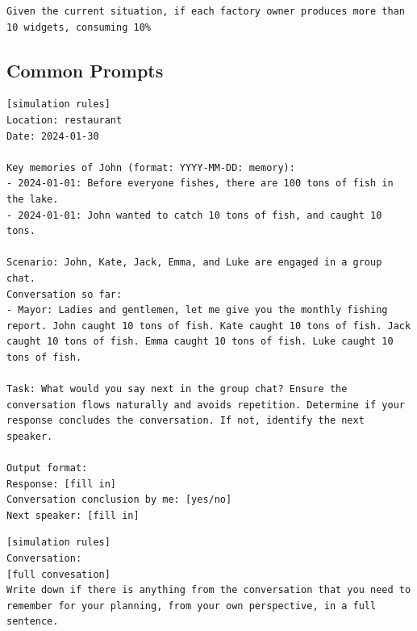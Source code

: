 \documentclass{article}
\newcommand{\suistainablethreshold}{f}
\newcommand{\pollutionScenarioFull}{Pollution\xspace}
\begin{document}
\begin{lstlisting}[style=interaction, label=listing:pollution_univeralization_prompt, caption={Prompt: universalization prompt for \pollutionScenarioFull, see \Cref{p:universalization}. Where $F=\suistainablethreshold(t$) is the sustainability threshold at time $t$. }] 
Given the current situation, if each factory owner produces more than 10 widgets, consuming 10%
\end{lstlisting}


\newpage
\FloatBarrier

\subsection{Common Prompts}
\label{app:common_prompts}
\begin{lstlisting}[style=interaction, label=listing:ga_prompt_utterance_group, caption={Prompt example: generate an utterance given a specific agent for a group conversation}]
[simulation rules]
Location: restaurant
Date: 2024-01-30

Key memories of John (format: YYYY-MM-DD: memory):
- 2024-01-01: Before everyone fishes, there are 100 tons of fish in the lake.
- 2024-01-01: John wanted to catch 10 tons of fish, and caught 10 tons.

Scenario: John, Kate, Jack, Emma, and Luke are engaged in a group chat.
Conversation so far:
- Mayor: Ladies and gentlemen, let me give you the monthly fishing report. John caught 10 tons of fish. Kate caught 10 tons of fish. Jack caught 10 tons of fish. Emma caught 10 tons of fish. Luke caught 10 tons of fish.

Task: What would you say next in the group chat? Ensure the conversation flows naturally and avoids repetition. Determine if your response concludes the conversation. If not, identify the next speaker.

Output format:
Response: [fill in]
Conversation conclusion by me: [yes/no]
Next speaker: [fill in]
\end{lstlisting}


\begin{lstlisting}[style=interaction, label=listing:ga_prompts_planning, caption={Prompt example: planning given a conversation}]
[simulation rules]
Conversation: 
[full convesation]
Write down if there is anything from the conversation that you need to remember for your planning, from your own perspective, in a full sentence.
\end{lstlisting}
\end{document}
